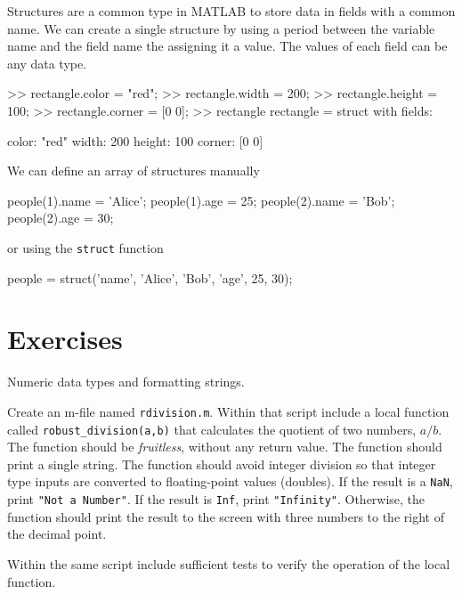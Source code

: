 \documentclass[../../book.tex]{subfiles}
\begin{document}
Structures are a common type in MATLAB to store data in fields with a common name. We can create a single structure by using a period between the variable name and the field name the assigning it a value.  The values of each field can be any data type.
\begin{code}
>> rectangle.color = "red";
>> rectangle.width = 200;
>> rectangle.height = 100;
>> rectangle.corner = [0 0];
>> rectangle
rectangle = 
  struct with fields:

     color: "red"
     width: 200
    height: 100
    corner: [0 0]
\end{code}

We can define an array of structures manually
\begin{code}
    people(1).name = 'Alice';
    people(1).age = 25;
    people(2).name = 'Bob';
    people(2).age = 30;
\end{code}

or using the \lstinline{struct} function
\begin{code}
people = struct('name', {'Alice', 'Bob'}, 'age', {25, 30});
\end{code}


\section{Exercises}

\begin{ex}
    Numeric data types and formatting strings.

    Create an m-file named \lstinline{rdivision.m}.  Within that script include a local function called \lstinline{robust_division(a,b)} that calculates the quotient of two numbers, $a/b$. The function should be \emph{fruitless}, without any return value.  The function should print a single string. The function should avoid integer division so that integer type inputs are converted to floating-point values (doubles).  If the result is a \lstinline{NaN}, print \lstinline{"Not a Number"}.  If the result is \lstinline{Inf}, print \lstinline{"Infinity"}. Otherwise, the function should print the result to the screen with three numbers to the right of the decimal point.
    
    Within the same script include sufficient tests to verify the operation of the local function.  
\end{ex}
\end{document}
